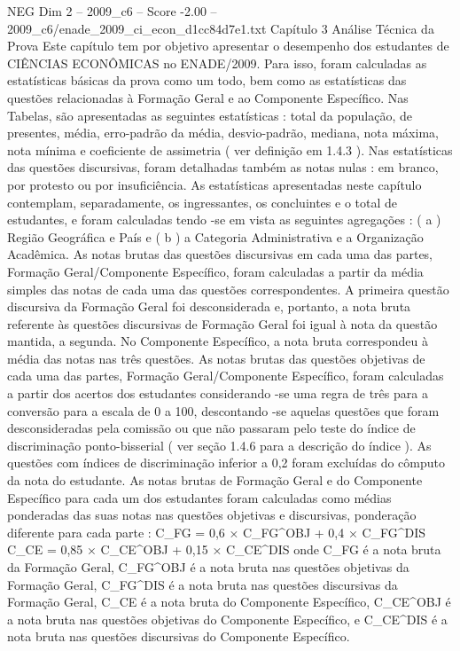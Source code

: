\begin{textsample}{NEG Dim 2 – 2009\_c6 – Score -2.00 – 2009\_c6/enade\_2009\_ci\_econ\_d1cc84d7e1.txt}  \label{ex:f2_neg_140}
Capítulo 3 Análise Técnica da Prova Este capítulo tem por objetivo apresentar o desempenho dos estudantes de CIÊNCIAS ECONÔMICAS no ENADE/2009.
Para isso, foram calculadas as estatísticas básicas da prova como um todo, bem como as estatísticas das questões relacionadas à Formação Geral e ao Componente Específico.
Nas Tabelas, são apresentadas as seguintes estatísticas : total da população, de presentes, média, erro-padrão da média, desvio-padrão, mediana, nota máxima, nota mínima e coeficiente de assimetria ( ver definição em 1.4.3 ).
Nas estatísticas das questões discursivas, foram detalhadas também as notas nulas : em branco, por protesto ou por insuficiência.
As estatísticas apresentadas neste capítulo contemplam, separadamente, os ingressantes, os concluintes e o total de estudantes, e foram calculadas tendo -se em vista as seguintes agregações : ( a ) Região Geográfica e País e ( b ) a Categoria Administrativa e a Organização Acadêmica.
As notas brutas das questões discursivas em cada uma das partes, Formação Geral/Componente Específico, foram calculadas a partir da média simples das notas de cada uma das questões correspondentes.
A primeira questão discursiva da Formação Geral foi desconsiderada e, portanto, a nota bruta referente às questões discursivas de Formação Geral foi igual à nota da questão mantida, a segunda.
No Componente Específico, a nota bruta correspondeu à média das notas nas três questões.
As notas brutas das questões objetivas de cada uma das partes, Formação Geral/Componente Específico, foram calculadas a partir dos acertos dos estudantes considerando -se uma regra de três para a conversão para a escala de 0 a 100, descontando -se aquelas questões que foram desconsideradas pela comissão ou que não passaram pelo teste do índice de discriminação ponto-bisserial ( ver seção 1.4.6 para a descrição do índice ).
As questões com índices de discriminação inferior a 0,2 foram excluídas do cômputo da nota do estudante.
As notas brutas de Formação Geral e do Componente Específico para cada um dos estudantes foram calculadas como médias ponderadas das suas notas nas questões objetivas e discursivas, ponderação diferente para cada parte : C\_FG = 0,6 × C\_FG\textasciicircum{}OBJ + 0,4 × C\_FG\textasciicircum{}DIS C\_CE = 0,85 × C\_CE\textasciicircum{}OBJ + 0,15 × C\_CE\textasciicircum{}DIS onde C\_FG é a nota bruta da Formação Geral, C\_FG\textasciicircum{}OBJ é a nota bruta nas questões objetivas da Formação Geral, C\_FG\textasciicircum{}DIS é a nota bruta nas questões discursivas da Formação Geral, C\_CE é a nota bruta do Componente Específico, C\_CE\textasciicircum{}OBJ é a nota bruta nas questões objetivas do Componente Específico, e C\_CE\textasciicircum{}DIS é a nota bruta nas questões discursivas do Componente Específico.

\end{textsample}

